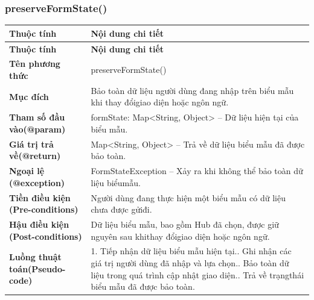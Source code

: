 \subsubsection{preserveFormState()}
\begin{longtable}{|L{0.24\textwidth}|L{0.70\textwidth}|}
\hline
\textbf{Thuộc tính} & \textbf{Nội dung chi tiết} \\
\hline
\endfirsthead
\hline
\textbf{Thuộc tính} & \textbf{Nội dung chi tiết} \\
\hline
\endhead
\textbf{Tên phương thức} & preserveFormState() \\
\hline
\textbf{Mục đích} & Bảo toàn dữ liệu người dùng đang nhập trên biểu mẫu khi thay đổi\newline giao diện hoặc ngôn ngữ. \\
\hline
\textbf{Tham số đầu vào}\newline \textbf{(@param)} & formState: Map<String, Object> – Dữ liệu hiện tại của biểu mẫu. \\
\hline
\textbf{Giá trị trả về(@return)} & Map<String, Object> – Trả về dữ liệu biểu mẫu đã được bảo toàn. \\
\hline
\textbf{Ngoại lệ (@exception)} & FormStateException – Xảy ra khi không thể bảo toàn dữ liệu biểu\newline mẫu. \\
\hline
\textbf{Tiền điều kiện (Pre-}\newline \textbf{conditions)} & Người dùng đang thực hiện một biểu mẫu có dữ liệu chưa được gửi\newline đi. \\
\hline
\textbf{Hậu điều kiện (Post-}\newline \textbf{conditions)} & Dữ liệu biểu mẫu, bao gồm Hub đã chọn, được giữ nguyên sau khi\newline thay đổigiao diện hoặc ngôn ngữ. \\
\hline
\textbf{Luồng thuật toán}\newline \textbf{(Pseudo-code)} & 1. Tiếp nhận dữ liệu biểu mẫu hiện tại.. Ghi nhận các giá trị người dùng đã nhập và lựa chọn.. Bảo toàn dữ liệu trong quá trình cập nhật giao diện.. Trả về trạngthái biểu mẫu đã được bảo toàn. \\
\hline
\end{longtable}
\vspace{-0.5\baselineskip}
